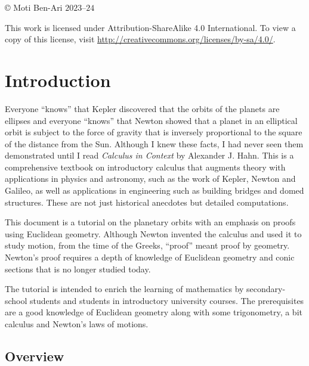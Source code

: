 \vfill

\begin{center}
\copyright{} Moti Ben-Ari $2023$--$24$
\end{center}
 
\begin{small}
This work is licensed under Attribution-ShareAlike 4.0 International. To view a copy of this license, visit \url{http://creativecommons.org/licenses/by-sa/4.0/}.
\end{small}

\newpage

\tableofcontents

\newpage


\chapter{Introduction}

Everyone ``knows'' that Kepler discovered that the orbits of the planets are ellipses and everyone ``knows'' that Newton showed that a planet in an elliptical orbit is subject to the force of gravity that is inversely proportional to the square of the distance from the Sun. Although I knew these facts, I had never seen them demonstrated until I read \textit{Calculus in Context} \cite{hahn-cic} by Alexander J. Hahn. This is a comprehensive textbook on introductory calculus that augments theory with  applications in physics and astronomy, such as the work of Kepler, Newton and Galileo, as well as applications in engineering such as building bridges and domed structures. These are not just historical anecdotes but detailed computations.

This document is a tutorial on the planetary orbits with an emphasis on proofs using Euclidean geometry. Although Newton invented the calculus and used it to study motion, from the time of the Greeks, ``proof'' meant proof by geometry. Newton's proof requires a depth of knowledge of Euclidean geometry and conic sections that is no longer studied today.

The tutorial is intended to enrich the learning of mathematics by secondary-school students and students in introductory university courses. The prerequisites are a good knowledge of Euclidean geometry along with some trigonometry, a bit calculus and Newton's laws of motions.

\section*{Overview}


